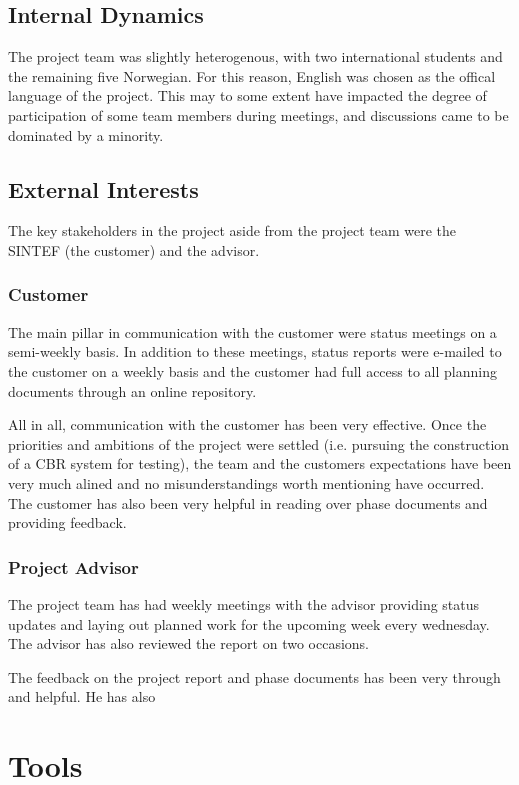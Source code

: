 \subsection{Internal Dynamics}
The project team was slightly heterogenous, with two international
students and the remaining five Norwegian. For this reason, English
was chosen as the offical language of the project. This may to some
extent have impacted the degree of participation of some team members
during meetings, and discussions came to be dominated by a minority. 

\subsection{External Interests}
The key stakeholders in the project aside from the project team were
the SINTEF (the customer) and the advisor.

\subsubsection{Customer}
The main pillar in communication with the customer were status
meetings on a semi-weekly basis. In addition to these meetings, status
reports were e-mailed to the customer on a weekly basis and the
customer had full access to all planning documents through an online
repository.

All in all, communication with the customer has been very
effective. Once the priorities and ambitions of the project were
settled (i.e. pursuing the construction of a CBR system for testing),
the team and the customers expectations have been very much alined and
no misunderstandings worth mentioning have occurred. The customer has
also been very helpful in reading over phase documents and providing feedback.

\subsubsection{Project Advisor}
The project team has had weekly meetings with the advisor providing
status updates and laying out planned work for the upcoming week every
wednesday. The advisor has also reviewed the report on two occasions.

The feedback on the project report and phase documents has been very
through and helpful. He has also 



\section{Tools}\label{toolseval}

